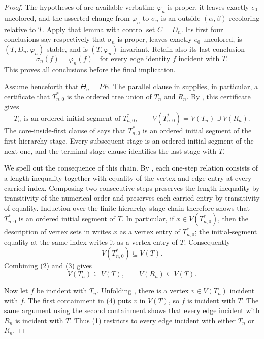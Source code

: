 \begin{proof}
The hypotheses of  are available
verbatim: $\varphi_n$ is proper, it leaves exactly $e_0$ uncolored, and
the asserted change from $\varphi_n$ to $\sigma_n$ is an outside
$(\alpha,\beta)$ recoloring relative to $T$.  Apply that lemma with
control set $C=D_n$.  Its first four conclusions say respectively that
$\sigma_n$ is proper, leaves exactly $e_0$ uncolored, is
$(T,D_n,\varphi_n)$-stable, and is $(T,\varphi_n)$-invariant.  Retain
also its last conclusion
\[
 \sigma_n(f)=\varphi_n(f)
 \quad\text{for every edge identity $f$ incident with $T$.}       \tag{1}
\]
This proves all conclusions before the final implication.

Assume henceforth that $\Theta_n=PE$.  The parallel clause in
 supplies, in particular, a certificate that
$T_{n,0}^{*}$ is the ordered tree union of $T_n$ and $R_n$.  By
, this certificate gives
\[
 T_n\text{ is an ordered initial segment of }T_{n,0}^{*},
 \qquad
 V(T_{n,0}^{*})=V(T_n)\cup V(R_n).                    \tag{2}
\]
The core-inside-first clause of  says that
$T_{n,0}^{*}$ is an ordered initial segment of the first hierarchy
stage.  Every subsequent stage is an ordered initial segment of the
next one, and the terminal-stage clause identifies the last stage with
$T$.

We spell out the consequence of this chain.  By
, each one-step relation consists of
a length inequality together with equality of the vertex and edge entry
at every carried index.  Composing two consecutive steps preserves the
length inequality by transitivity of the numerical order and preserves
each carried entry by transitivity of equality.  Induction over the
finite hierarchy-stage chain therefore shows that
$T_{n,0}^{*}$ is an ordered initial segment of $T$.  In particular, if
$x\in V(T_{n,0}^{*})$, then the description of vertex sets in
 writes $x$ as a vertex entry of
$T_{n,0}^{*}$; the initial-segment equality at the same index writes it
as a vertex entry of $T$.  Consequently
\[
 V(T_{n,0}^{*})\subseteq V(T).                         \tag{3}
\]
Combining (2) and (3) gives
\[
 V(T_n)\subseteq V(T),\qquad V(R_n)\subseteq V(T).      \tag{4}
\]

Now let $f$ be incident with $T_n$.  Unfolding
, there is a vertex $v\in V(T_n)$ incident
with $f$.  The first containment in (4) puts $v$ in $V(T)$, so $f$ is
incident with $T$.  The same argument using the second containment
shows that every edge incident with $R_n$ is incident with $T$.  Thus
(1) restricts to every edge incident with either $T_n$ or $R_n$.


\end{proof}
